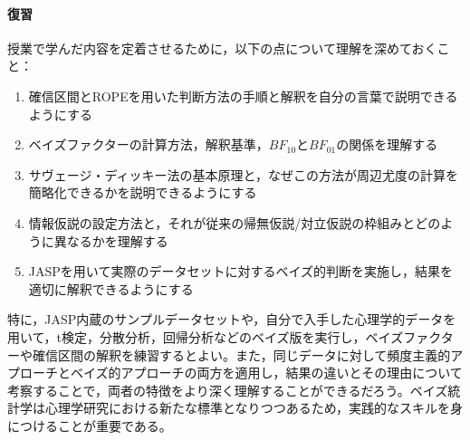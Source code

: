 \paragraph{復習}
授業で学んだ内容を定着させるために，以下の点について理解を深めておくこと：

\begin{enumerate}
\item 確信区間とROPEを用いた判断方法の手順と解釈を自分の言葉で説明できるようにする
\item ベイズファクターの計算方法，解釈基準，$BF_{10}$と$BF_{01}$の関係を理解する
\item サヴェージ・ディッキー法の基本原理と，なぜこの方法が周辺尤度の計算を簡略化できるかを説明できるようにする
\item 情報仮説の設定方法と，それが従来の帰無仮説/対立仮説の枠組みとどのように異なるかを理解する
\item JASPを用いて実際のデータセットに対するベイズ的判断を実施し，結果を適切に解釈できるようにする
\end{enumerate}

特に，JASP内蔵のサンプルデータセットや，自分で入手した心理学的データを用いて，t検定，分散分析，回帰分析などのベイズ版を実行し，ベイズファクターや確信区間の解釈を練習するとよい。また，同じデータに対して頻度主義的アプローチとベイズ的アプローチの両方を適用し，結果の違いとその理由について考察することで，両者の特徴をより深く理解することができるだろう。ベイズ統計学は心理学研究における新たな標準となりつつあるため，実践的なスキルを身につけることが重要である。